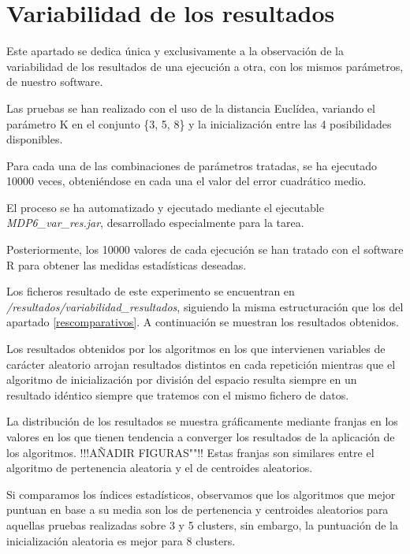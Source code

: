\documentclass[a4paper]{report}
\begin{document}
	
	\FloatBarrier
		
	\section{Variabilidad de los resultados}
	\label{resestadisticos}
	Este apartado se dedica única y exclusivamente a la observación de la variabilidad de los resultados de una ejecución a otra, con los mismos parámetros, de nuestro software.
	
	Las pruebas se han realizado con el uso de la distancia Euclídea, variando el parámetro K en el conjunto \{3, 5, 8\} y la inicialización entre las 4 posibilidades disponibles.
	
	Para cada una de las combinaciones de parámetros tratadas,  se ha ejecutado 10000 veces, obteniéndose en cada una el valor del error cuadrático medio.
	
	El proceso se ha automatizado y ejecutado mediante el ejecutable \textit{MDP6\_var\_res.jar}, desarrollado especialmente para la tarea.
	
	Posteriormente, los 10000 valores de cada ejecución se han tratado con el software R para obtener  las medidas estadísticas deseadas.
	
	Los ficheros resultado de este experimento se encuentran en \textit{/resultados/variabilidad\_resultados}, siguiendo la misma estructuración que los del apartado \ref{rescomparativos}. A continuación se muestran los resultados obtenidos.
	
	
	
	
	Los resultados obtenidos por los algoritmos en los que intervienen variables de carácter aleatorio arrojan resultados distintos en cada repetición mientras que el algoritmo de inicialización por división del espacio resulta siempre en un resultado idéntico siempre que tratemos con el mismo fichero de datos.
	
	La distribución de los resultados se muestra gráficamente mediante franjas en los valores en los que tienen tendencia a converger los resultados de la aplicación de los algoritmos. !!!AÑADIR FIGURAS""!! Estas franjas son similares entre el algoritmo de pertenencia aleatoria y el de centroides aleatorios.
	
	Si comparamos los índices estadísticos, observamos que los algoritmos que mejor puntuan en base a su media son los de pertenencia y centroides aleatorios para aquellas pruebas realizadas sobre 3 y 5 clusters, sin embargo, la puntuación de la inicialización aleatoria es mejor para 8 clusters.
	
\end{document}
